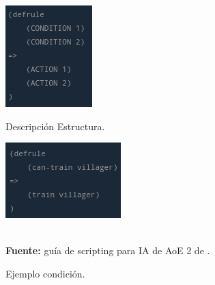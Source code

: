 \begin{figure}[ht]
\centering
\begin{minipage}[c]{0.45\linewidth}
	\hspace{20mm}
	\includegraphics[height=0.15\textheight]{imagenes/marco_teo/referentes/aoe_scripting_1.png}
	\caption{Descripción Estructura.}
	\label{img:aoe_script_1}
\end{minipage}
\begin{minipage}[c]{0.45\linewidth}
	\hspace{9mm}
	\includegraphics[height=0.15\textheight]{imagenes/marco_teo/referentes/aoe_scripting_2.png}
	\caption{Ejemplo condición.}
	\label{img:aoe_script_2}
\end{minipage}\\[3mm]
\textbf{Fuente:} guía de scripting para \ac{IA} de \ac{AoE} 2 de \citeauthor*{redmechanic2017}.
\label{img:aoe_scripting_1}	
\end{figure}

